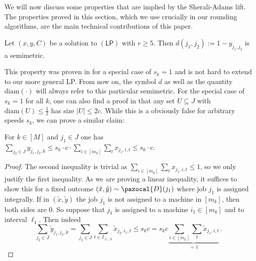   We will now discuss some properties that are implied by the Sherali-Adams lift.
  The properties proved in this section, which we use crucially in our rounding algorithms, are the main technical contributions of this paper.
  
  \begin{lemma}\label{lem:Relmetric}
  Let $(x,y,C)$ be a solution to $(\mathsf{LP})$ with $r \geq 5$. Then $d(j_1,j_2) := 1-y_{j_1,j_2}$ is a semimetric.
  \end{lemma}
  This property was proven in \cite{DKRTZ20} for a special case of $s_k = 1$
  and is not hard to extend to our more general LP. From now on, the symbol $d$ as well as the quantity $\textrm{diam}( \cdot )$ will always refer to this particular semimetric. 
  For the special case of $s_k = 1$ for all $k$, one can also find a proof in \cite{DKRTZ20} that any set $U \subseteq J$ with $\textrm{diam}(U) \leq \frac{1}{2}$ has size $|U| \leq 2c$.
  While this is a obviously false for arbitrary speeds $s_k$, we can prove a similar claim: 
  \begin{lemma} \label{lem:BoundSumOfYj1j2kForFixedJ1}
  For $k \in [M]$ and $j_1 \in J$ one has $\sum_{j_2 \in J} y_{j_1,j_2,k} \leq s_k \cdot c \cdot \sum_{i \in [m_k]}\sum_{t}
  x_{j_1,i,t} \leq s_k \cdot c$.
  \end{lemma}
  \begin{proof}
    The second inequality is trivial as $\sum_{i \in [m_k]} \sum_{t} x_{j_1,i,t} \leq 1$, so we only justify the first inequality. 
  As we are proving a linear inequality, it suffices to show this for a fixed outcome $(\tilde{x},\tilde{y}) \sim \pazocal{D}(j_1)$ where job $j_1$ is assigned integrally. 
  If in $(\tilde{x},\tilde{y})$ the job $j_1$ is not assigned to a machine in $[m_k]$, then both sides are 0. 
  So suppose that $j_1$ is assigned to a machine $i_1 \in [m_k]$ and to interval $\ell_1$.
  Then indeed
  \[
  \sum_{j_2 \in J} \tilde{y}_{j_1,j_2,k} = \sum_{j_2 \in J} \sum_{t \in I_{\ell_1,k}} \tilde{x}_{j_2,i_1,t} \leq s_k c = s_k c \underbrace{\sum_{i \in [m_k]}\sum_{t} \tilde{x}_{j_1,i,t}}_{=1}
  \,.
  \]
  \end{proof}
  
